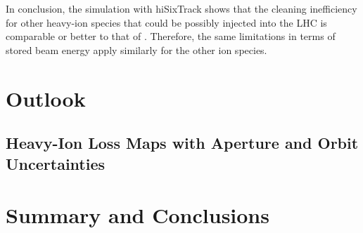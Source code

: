 In conclusion, the simulation with hiSixTrack shows that the cleaning inefficiency for other heavy-ion species that could be possibly injected into the LHC is comparable or better to that of \lead. Therefore, the same limitations in terms of stored beam energy apply similarly for the other ion species. 


\chapter{Outlook}

\subsection{}



\section{Heavy-Ion Loss Maps with Aperture and Orbit Uncertainties}



\chapter{Summary and Conclusions}

